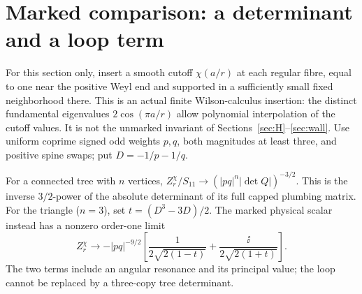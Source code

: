 \section{Marked comparison: a determinant and a loop term}\label{sec:marked}

For this section only, insert a smooth cutoff \(\chi(a/r)\) at each regular fibre, equal to one near the positive Weyl end and supported in a sufficiently small fixed neighborhood there. This is an actual finite Wilson-calculus insertion: the distinct fundamental eigenvalues \(2\cos(\pi a/r)\) allow polynomial interpolation of the cutoff values. It is not the unmarked invariant of Sections~\ref{sec:H}--\ref{sec:wall}. Use uniform coprime signed odd weights \(p,q\), both magnitudes at least three, and positive spine swaps; put \(D=-1/p-1/q\).

\begin{proposition}\label{prop:marked}
For a connected tree with \(n\) vertices, \(Z_r^\chi/S_{11}\to (|pq|^n|\det Q|)^{-3/2}\). This is the inverse \(3/2\)-power of the absolute determinant of its full capped plumbing matrix. For the triangle (\(n=3\)), set \(t=(D^3-3D)/2\). The marked physical scalar instead has a nonzero order-one limit
\begin{equation}\label{eq:marked-tri}
 Z_r^\chi\longrightarrow -|pq|^{-9/2}
 \left[\frac1{2\sqrt{2(1-t)}}+\frac{\ii}{2\sqrt{2(1+t)}}\right].
\end{equation}
The two terms include an angular resonance and its principal value; the loop cannot be replaced by a three-copy tree determinant.
\end{proposition}

